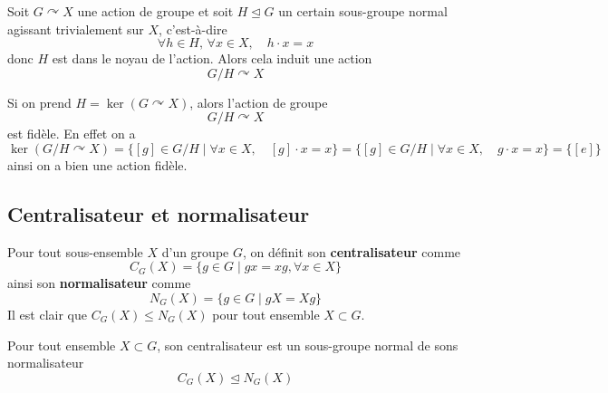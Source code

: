 \begin{proposition}
	Soit $G \curvearrowright X$ une action de groupe et soit $H \trianglelefteq G$ un certain sous-groupe normal agissant trivialement sur $X$, c'est-à-dire
	\[
	\forall h \in H, \, \forall x \in X, \quad h \cdot x = x
	\]
	donc $H$ est dans le noyau de l'action. Alors cela induit une action
	\[
	G/H \curvearrowright X
	\]
\end{proposition}


\begin{remarque} \label{rmq: action fidèle induite}
	Si on prend $H = \ker(G \curvearrowright X)$, alors l'action de groupe
	\[
	G/H \curvearrowright X
	\]
	est fidèle. En effet on a
	\[
	\ker(G/H \curvearrowright X) = \{ [g] \in G/H \mid \forall x \in X, \quad [g] \cdot x = x\} = \{ [g] \in G/H \mid \forall x \in X, \quad g \cdot x = x\} = \{[e]\}
	\]
	ainsi on a bien une action fidèle.
\end{remarque}

\subsection{Centralisateur et normalisateur}
\begin{definition}
	Pour tout sous-ensemble $X$ d'un groupe $G$, on définit son \textbf{centralisateur} comme
	\[
	C_G(X) = \big\{ g \in G \mid  gx = xg, \forall x \in X\}
	\]
	ainsi son \textbf{normalisateur} comme
	\[
	N_G(X) = \{g \in G \mid g X = Xg\}
	\]
	Il est clair que $C_G(X) \leq N_G(X)$ pour tout ensemble $X \subset G$.
\end{definition}

\begin{proposition}
	Pour tout ensemble $X \subset G$, son centralisateur est un sous-groupe normal de sons normalisateur
	\[
	C_G(X) \trianglelefteq N_G(X)
	\]
\end{proposition}



